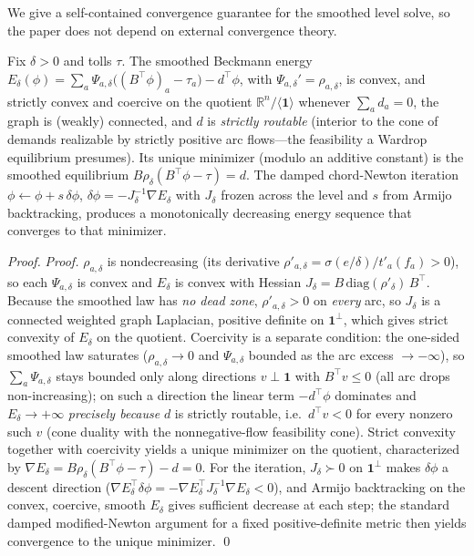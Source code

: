 \documentclass[ijoc]{informs3}
\newcommand{\R}{\mathbb{R}}
\begin{document}
We give a self-contained convergence guarantee for the
smoothed level solve, so the paper does not depend on external convergence theory.

\begin{proposition}\label{prop:conv}
Fix $\delta>0$ and tolls $\tau$. The smoothed Beckmann energy
$E_\delta(\phi)=\sum_a\Psi_{a,\delta}\big((B^\top\phi)_a-\tau_a\big)-d^\top\phi$, with
$\Psi_{a,\delta}'=\rho_{a,\delta}$, is convex, and strictly convex and coercive on the quotient
$\R^n/\langle\mathbf1\rangle$ whenever $\sum_a d_a=0$, the graph is (weakly) connected, and $d$ is
\emph{strictly routable} (interior to the cone of demands realizable by strictly positive arc flows---the
feasibility a Wardrop equilibrium presumes). Its unique minimizer (modulo an
additive constant) is the smoothed equilibrium $B\rho_\delta(B^\top\phi-\tau)=d$. The damped chord-Newton
iteration $\phi\leftarrow\phi+s\,\delta\phi$, $\delta\phi=-J_\delta^{-1}\nabla E_\delta$ with $J_\delta$ frozen
across the level and $s$ from Armijo backtracking, produces a monotonically decreasing energy sequence that
converges to that minimizer.
\end{proposition}
\begin{proof}{\it Proof.}
$\rho_{a,\delta}$ is nondecreasing (its derivative $\rho'_{a,\delta}=\sigma(e/\delta)/t'_a(f_a)>0$), so each
$\Psi_{a,\delta}$ is convex and $E_\delta$ is convex with Hessian $J_\delta=B\,\mathrm{diag}(\rho'_\delta)\,B^\top$.
Because the smoothed law has \emph{no dead zone}, $\rho'_{a,\delta}>0$ on \emph{every} arc, so $J_\delta$ is a
connected weighted graph Laplacian, positive definite on $\mathbf1^\perp$, which gives strict convexity of
$E_\delta$ on the quotient. Coercivity is a separate condition: the one-sided smoothed law saturates
($\rho_{a,\delta}\to0$ and $\Psi_{a,\delta}$ bounded as the arc excess $\to-\infty$), so $\sum_a\Psi_{a,\delta}$
stays bounded only along directions $v\perp\mathbf1$ with $B^\top v\le0$ (all arc drops non-increasing); on such
a direction the linear term $-d^\top\phi$ dominates and $E_\delta\to+\infty$ \emph{precisely because} $d$ is
strictly routable, i.e.\ $d^\top v<0$ for every nonzero such $v$ (cone duality with the nonnegative-flow
feasibility cone). Strict convexity together with coercivity yields a unique minimizer on the quotient,
characterized by $\nabla E_\delta=B\rho_\delta(B^\top\phi-\tau)-d=0$. For the iteration, $J_\delta\succ0$ on $\mathbf1^\perp$ makes
$\delta\phi$ a descent direction ($\nabla E_\delta^\top\delta\phi=-\nabla E_\delta^\top J_\delta^{-1}\nabla
E_\delta<0$), and Armijo backtracking on the convex, coercive, smooth $E_\delta$ gives sufficient decrease at each
step; the standard damped modified-Newton argument for a fixed positive-definite metric then yields convergence
to the unique minimizer. \qed
\end{proof}
\end{document}
